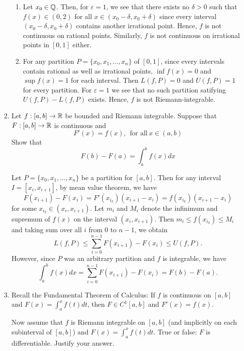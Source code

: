 \documentclass[12pt]{article}
\begin{document}
\begin{enumerate}
\begin{mybox}
  \begin{enumerate}
    \item Let $x_0\in\mathbb{Q}$. Then, for $\varepsilon=1$, we see
    that there exists no $\delta>0$ such that $f(x)\in (0,2)$
    for all $x\in (x_0-\delta,x_0+\delta)$ since every interval
    $(x_0-\delta,x_0+\delta)$ contains another irrational
    point. Hence, $f$ is not continuous on rational points.
    Similarly, $f$ is not continuous on irrational points in
    $[0,1]$ either.
    \item For any partition $P=\{x_0,x_1,\ldots,x_n\}$ of
    $[0,1]$, since every intervals contain rational as well as
    irrational points, $\inf{f(x)}=0$ and $\sup{f(x)}=1$ for
    each interval. Then $L(f,P)=0$ and $U(f,P)=1$ for every
    partition. For $\varepsilon=1$ we see that no such partition
    satifying $U(f,P)-L(f,P)$ exists. Hence, $f$ is not
    Riemann-integrable.
    \end{enumerate}
\end{mybox}

    
\item Let $f: [a,b] \to \mathbb{R}$ be bounded and Riemann integrable.
Suppose that $F: [a,b] \to \mathbb{R}$ is continuous and 
$$F'(x) = f(x),   \ \ \text{for all} \ x \in (a,b)$$
Show that 
$$F(b) - F(a) = \int_a^b f(x) dx $$

\begin{mybox}
    
Let $P=\{x_0,x_1,\ldots,x_n\}$ be a partition for $[a,b]$.
Then for any interval $I=[x_i,x_{i+1}]$, by mean value theorem,
we have $$F(x_{i+1})-F(x_i)=F'(x_{i_k})(x_{i+1}-x_i)=
f(x_{i_k})(x_{i+1}-x_i)$$
for some $x_{i_k}\in (x_i,x_{i+1})$. Let $m_i$ and $M_i$ denote
the infinimum and supremum of $f(x)$ on the interval
$(x_i,x_{i+1})$. Then $m_i\leq f(x_{i_k})\leq M_i$ and taking
sum over all $i$ from 0 to $n-1$, we obtain
$$L(f,P)\leq \sum_{i=0}^{n-1}{F(x_{i+1})-F(x_i)}\leq U(f,P).$$
However, since $P$ was an arbitrary partition and $f$ is
integrable, we have
$$\int_a^b f(x) dx =\sum_{i=0}^{n-1}{F(x_{i+1})-F(x_i)}
=F(b) - F(a).$$
\end{mybox}

\item Recall the Fundamental Theorem of Calculus:
If $f$ is continuous on $[a,b]$ and $F(x) = \int_a^x
f(t) dt$, then $F \in C^1[a,b]$ and $F'(x) = f(x)$.

\vspace*{1mm}
Now assume that $f$ is Riemann integrable on $[a,b]$ (and
implicitly on each subinterval of $[a,b]$) and $F(x) =
\int_a^x f(t) dt$. True or false: $F$ is differentiable.
Justify your answer. 
  

\end{enumerate}
\end{document}
